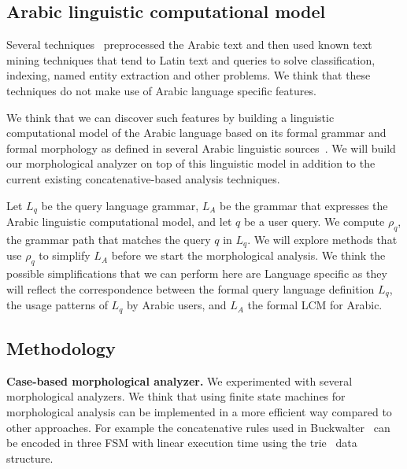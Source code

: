 \documentclass[12pt]{article}
\begin{document}
\subsection{Arabic linguistic computational model }
\label{s:design:lcm}

Several techniques~\cite{AEL07,Ham07,Abd07,MEl03} 
preprocessed the Arabic text and then used known text 
mining techniques that tend to Latin text and queries
to solve classification, indexing, named entity 
extraction and other problems.
We think that these techniques do not make use 
of Arabic language specific features.

We think that we can discover such features by building
a linguistic computational model of the Arabic language
based on its formal grammar and formal morphology
as defined in several Arabic linguistic 
sources~\cite{Sha73,Abd00,Abd001}.
We will build our morphological analyzer on top 
of this linguistic model in addition to the current existing
concatenative-based analysis techniques. 

Let $L_q$ be the query language grammar, 
$L_A$ be the grammar that expresses the Arabic linguistic
computational model, and let $q$ be a user query.
We compute $\rho_q$, the grammar path that matches 
the query $q$ in $L_q$. 
We will explore methods that use $\rho_q$ to simplify 
$L_A$ before we start the morphological analysis. 
We think the possible simplifications that we can perform
here are Language specific as they will reflect the 
correspondence between the formal query language definition $L_q$, 
the usage patterns of $L_q$  by Arabic users, 
and $L_A$ the formal LCM for Arabic. 


\subsection{Methodology}
\label{s:design:method}

\begin{figure}
\end{figure}

{\bf Case-based morphological analyzer.}
We experimented with several morphological analyzers.
We think that using finite state machines for morphological analysis
can be implemented in a more efficient way compared to other 
approaches. 
For example the concatenative rules used in Buckwalter~\cite{Tim04}
can be encoded in three FSM with linear execution time using 
the trie~\cite{Aoe:89} data structure. 
\end{document}
